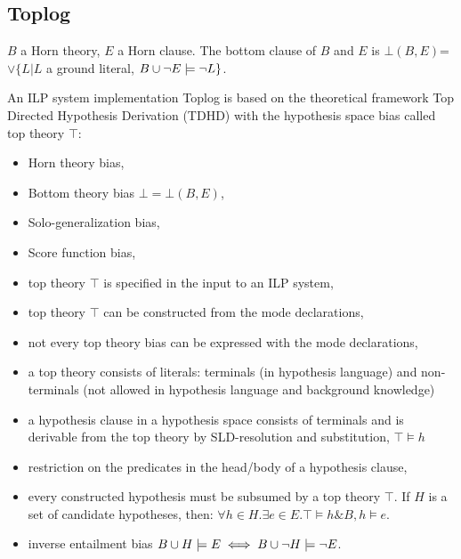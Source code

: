 \iffalse
\subsection{Progol}
\begin{itemize}
\item Inverse Entailment,
\item a bias provided by mode declaration,
\end{itemize}
\fi

\subsection{Toplog}
\begin{defn}
$B$ a Horn theory, $E$ a Horn clause. The bottom clause of $B$ and $E$ is $\bot(B,E)$=$\vee\{L | L $ a ground literal, $B \cup {\neg E} \models \neg L\}$.
\end{defn}
An ILP system implementation Toplog is based on the theoretical framework Top Directed Hypothesis Derivation (TDHD) with the hypothesis space bias called top theory $\top$:
\begin{itemize}
\item Horn theory bias,
\item Bottom theory bias $\bot = \bot(B,E)$,
\item Solo-generalization bias,
\item Score function bias,
\item top theory $\top$ is specified in the input to an ILP system,
\item top theory $\top$ can be constructed from the mode declarations,
\item not every top theory bias can be expressed with the mode declarations,
\item a top theory consists of literals: terminals (in hypothesis language) and non-terminals (not allowed in hypothesis language and background knowledge)
\item a hypothesis clause in a hypothesis space consists of terminals and is derivable from the top theory by SLD-resolution and substitution, $\top \models h$
\item restriction on the predicates in the head/body of a hypothesis clause,
\item every constructed hypothesis must be subsumed by a top theory $\top$. If $H$ is a set of candidate hypotheses, then: $\forall h \in H. \exists e \in E. \top \models h \& B, h \models e$.
\item inverse entailment bias $B \cup H \models E \iff B \cup \neg H \models \neg E$.
\end{itemize}
